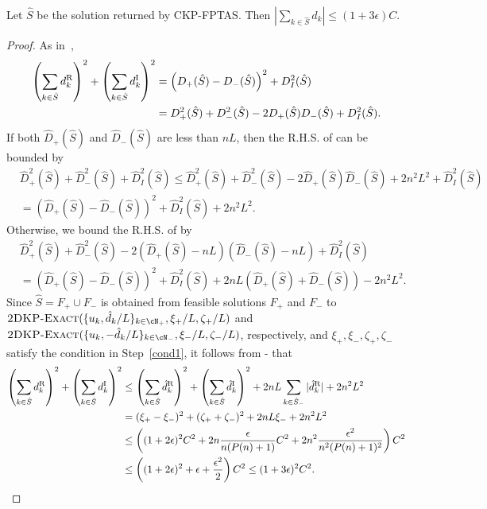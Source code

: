 \begin{lemma}\label{lem-trunc2}
Let $\hat S$ be the solution returned by {\sc CKP-FPTAS}. Then $|\sum_{k\in\hat S}d_k|\le(1+3\epsilon) C$. 
\end{lemma}
\begin{proof}
As in~,
\begin{align}\label{eq:ee1}
\left( \sum_{k \in \hat S} d_k^{\rm R} \right)^2 +  \left(\sum_{k \in \hat S} d_k^{\rm I} \right)^2 &=\left(D_+(\hat S)- D_-(\hat S)\right)^2 +  D_I^2(\hat S)\nonumber\\
&=D_+^2(\hat S)+D_-^2(\hat S)-2D_+(\hat S)D_-(\hat S)+D_I^2(\hat S).
\end{align} 
If both $\hat D_+(\hat S)$ and $\hat D_-(\hat S)$  are less than $nL$, then the R.H.S. of  can be bounded by 
\begin{align}\label{eq:ee2}
&\hat D_+^2(\hat S)+\hat D_-^2(\hat S)+\hat D_I^2(\hat S)
\le\hat D_+^2(\hat S)+\hat D_-^2(\hat S)-2\hat D_+(\hat S)\hat D_-(\hat S)+2n^2L^2+\hat D_I^2(\hat S)\nonumber\\
&=(\hat D_+(\hat S)-\hat D_-(\hat S))^2+\hat D_I^2(\hat S)+2n^2L^2.
\end{align}
Otherwise, we bound the R.H.S. of  by
\begin{align}\label{eq:ee3}
&\hat D_+^2(\hat S)+\hat D_-^2(\hat S)-2(\hat D_+(\hat S)-nL)(\hat D_-(\hat S)-nL)+\hat D_I^2(\hat S)\nonumber\\
&=(\hat D_+(\hat S)-\hat D_-(\hat S))^2+\hat D_I^2(\hat S)+2nL(\hat D_+(\hat S)+\hat D_-(\hat S))-2n^2L^2.
\end{align}
Since $\hat S=F_+\cup F_-$ is obtained from feasible solutions $F_+$ and $F_-$ to $\text{\sc 2DKP-Exact}(\{u_k,\hat d_k/L\}_{k\in\cN_+}, \xi_+/L,\zeta_+/L)$
 and $\text{\sc 2DKP-Exact}(\{u_k,-\hat d_k/L\}_{k\in \cN_-}, \xi_-/L,\zeta_-/L)$, respectively, and  $\xi_+ , \xi_-,\zeta_+, \zeta_-$ satisfy the condition in Step~\ref{cond1}, it follows from - that
\begin{align*}
\left( \sum_{k \in \hat S} d_k^{\rm R} \right)^2 +  \left(\sum_{k \in \hat S} d_k^{\rm I} \right)^2 &\le \left( \sum_{k \in \hat S} \hat d_k^{\rm R}\right)^2 +  \left(\sum_{k \in \hat S}\hat d_k^{\rm I} \right)^2+2nL\sum_{k \in \hat S_-} |\hat d_k^{\rm R}|+2n^2L^2\nonumber\\
&=(\xi_+ - \xi_-)^2 + (\zeta_+ + \zeta_-)^2 + 2nL\xi_-+2n^2L^2\nonumber\\
&\le \left((1+2\epsilon)^2C^2 +2n\frac{\epsilon}{n(P(n)+1)} C^2 + 2n^2\frac{\epsilon^2}{n^2(P(n)+1)^2}\right)C^2\\
&\le \left((1+2\epsilon)^2 +\epsilon + \frac{\epsilon^2}{2}\right)C^2\le (1+3\epsilon)^2C^2.
\end{align*}
\end{proof}

